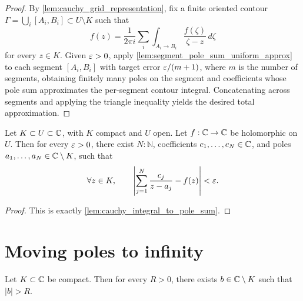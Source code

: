 \begin{proof}
    \leanok
    By \cref{lem:cauchy_grid_representation}, fix a finite oriented contour
    \(\Gamma = \bigcup_i [A_i, B_i] \subset U \setminus K\) such that
    \[
      f(z)
      = \frac{1}{2\pi i}\sum_i \int_{A_i \to B_i}
        \frac{f(\zeta)}{\zeta-z}\,d\zeta
    \]
    for every \(z \in K\). Given \(\varepsilon > 0\), apply
    \cref{lem:segment_pole_sum_uniform_approx} to each segment \([A_i, B_i]\)
    with target error \(\varepsilon/(m+1)\), where \(m\) is the number of segments,
    obtaining finitely many poles on the segment and coefficients whose pole
    sum approximates the per-segment contour integral. Concatenating across
    segments and applying the triangle inequality yields the desired total
    approximation.
\end{proof}

\begin{proposition}
    \label{prop:rational_approximation}
    Let \(K \subset U \subset \mathbb{C}\), with \(K\) compact and \(U\) open. Let
    \(f : \mathbb{C} \to \mathbb{C}\) be holomorphic on \(U\). Then for every \(\varepsilon > 0\), there
    exist \(N : \mathbb{N}\), coefficients \(c_1,\dots,c_N \in \mathbb{C}\), and poles
    \(a_1,\dots,a_N \in \mathbb{C} \setminus K\), such that
    \[
      \forall z \in K,\qquad
      \left|
        \sum_{j=1}^N \frac{c_j}{z-a_j} - f(z)
      \right| < \varepsilon .
    \]
\end{proposition}

\begin{proof}
    This is exactly \cref{lem:cauchy_integral_to_pole_sum}.
\end{proof}

\section{Moving poles to infinity}

\begin{lemma}
    \label{lem:compact_complement_unbounded}
    \leanok
    Let \(K \subset \mathbb{C}\) be compact. Then for every \(R > 0\), there exists
    \(b \in \mathbb{C} \setminus K\) such that \(|b| > R\).
\end{lemma}

